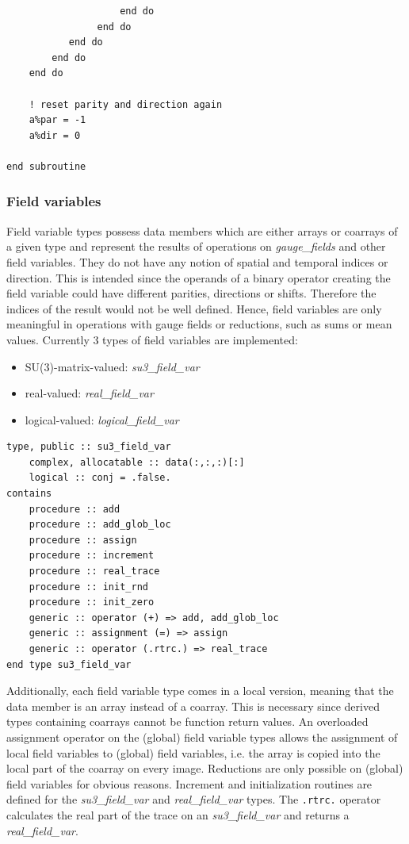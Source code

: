 \documentclass[graybox]{svmult}
\begin{document}
\begin{lstlisting}
                    end do
                end do
           end do
        end do
    end do

    ! reset parity and direction again
    a%par = -1
    a%dir = 0

end subroutine
\end{lstlisting}

\subsubsection*{Field variables}
Field variable types possess data members which are either arrays or coarrays of a given type and represent the results of operations on \emph{gauge\_fields} and other field variables. They do not have any notion of spatial and temporal indices or direction. This is intended since the operands of a binary operator creating the field variable could have different parities, directions or shifts. Therefore the indices of the result would not be well defined. Hence, field variables are only meaningful in operations with gauge fields or reductions, such as sums or mean values.
Currently 3 types of field variables are implemented:
\begin{itemize}
	\item SU(3)-matrix-valued: \emph{su3\_field\_var}
	\item real-valued: \emph{real\_field\_var}
	\item logical-valued: \emph{logical\_field\_var}
\end{itemize}
\begin{lstlisting}[caption={Type definition of the \emph{su3\_field\_var} type}]
type, public :: su3_field_var
    complex, allocatable :: data(:,:,:)[:]
    logical :: conj = .false.
contains
    procedure :: add
    procedure :: add_glob_loc
    procedure :: assign
    procedure :: increment
    procedure :: real_trace
    procedure :: init_rnd
    procedure :: init_zero
    generic :: operator (+) => add, add_glob_loc
    generic :: assignment (=) => assign
    generic :: operator (.rtrc.) => real_trace
end type su3_field_var
\end{lstlisting}
Additionally, each field variable type comes in a local version, meaning that the data member is an array instead of a coarray. This is necessary since derived types containing coarrays cannot be function return values. An overloaded assignment operator on the (global) field variable types allows the assignment of local field variables to (global) field variables, i.e. the array is copied into the local part of the coarray on every image. Reductions are only possible on (global) field variables for obvious reasons. Increment and initialization routines are defined for the \emph{su3\_field\_var} and \emph{real\_field\_var} types. The \lstinline{.rtrc.}{} operator calculates the real part of the trace on an \emph{su3\_field\_var} and returns a \emph{real\_field\_var}.
\end{document}

